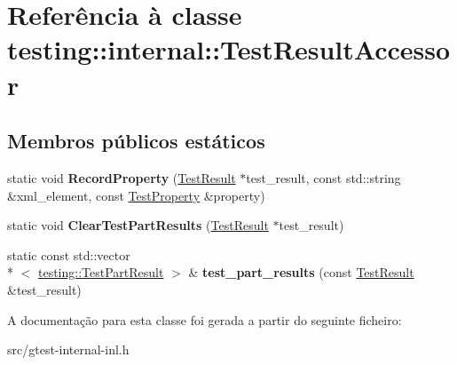 \hypertarget{classtesting_1_1internal_1_1TestResultAccessor}{\section{Referência à classe testing\-:\-:internal\-:\-:Test\-Result\-Accessor}
\label{classtesting_1_1internal_1_1TestResultAccessor}
}
\subsection*{Membros públicos estáticos}
\begin{DoxyCompactItemize}
\item 
\hypertarget{classtesting_1_1internal_1_1TestResultAccessor_abcc4b32d1b201eeef92f0ec0ae161cf9}{static void {\bfseries Record\-Property} (\hyperlink{classtesting_1_1TestResult}{Test\-Result} $\ast$test\-\_\-result, const std\-::string \&xml\-\_\-element, const \hyperlink{classtesting_1_1TestProperty}{Test\-Property} \&property)}\label{classtesting_1_1internal_1_1TestResultAccessor_abcc4b32d1b201eeef92f0ec0ae161cf9}

\item 
\hypertarget{classtesting_1_1internal_1_1TestResultAccessor_a53c626632bac65d82d88e432072b866b}{static void {\bfseries Clear\-Test\-Part\-Results} (\hyperlink{classtesting_1_1TestResult}{Test\-Result} $\ast$test\-\_\-result)}\label{classtesting_1_1internal_1_1TestResultAccessor_a53c626632bac65d82d88e432072b866b}

\item 
\hypertarget{classtesting_1_1internal_1_1TestResultAccessor_a55d771904317c1b0cc380104d175f1db}{static const std\-::vector\\*
$<$ \hyperlink{classtesting_1_1TestPartResult}{testing\-::\-Test\-Part\-Result} $>$ \& {\bfseries test\-\_\-part\-\_\-results} (const \hyperlink{classtesting_1_1TestResult}{Test\-Result} \&test\-\_\-result)}\label{classtesting_1_1internal_1_1TestResultAccessor_a55d771904317c1b0cc380104d175f1db}

\end{DoxyCompactItemize}


A documentação para esta classe foi gerada a partir do seguinte ficheiro\-:\begin{DoxyCompactItemize}
\item 
src/gtest-\/internal-\/inl.\-h\end{DoxyCompactItemize}
